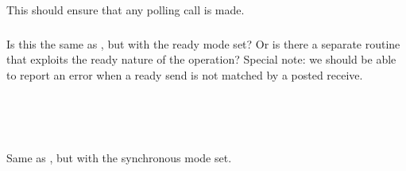 \documentclass{article}
\begin{document}
\subsubsection{}
\begin{adi3}
\end{adi3}

\subsubsection{}
\begin{adi3}
\begin{mmadi}\\
\\
\begin{core}
This should ensure that any polling call is made.
\end{core}
\end{mmadi}
\end{adi3}

\subsubsection{}
Is this the same as , but with the ready mode set?  Or is
there a separate routine that exploits the ready nature of the operation?
Special note: we should be able to report an error when a ready send is not
matched by a posted receive.
\subsubsection{}
\begin{adi3}
\begin{mmadi}\\
\\
\begin{core}
\end{core}
\end{mmadi}
\end{adi3}
\subsubsection{}
Same as , but with the synchronous mode set.
\end{document}
